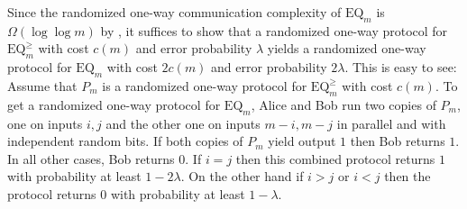 \documentclass{article}\usepackage[a4paper,margin=20mm]{geometry}
\renewcommand{\geq}{\geqslant}
\begin{document}
Since the randomized one-way communication complexity of $\mathrm{EQ}_m$ is $\Omega(\log \log m)$ by , it suffices to 
show that a randomized one-way protocol for $\mathrm{EQ}^{\geq}_m$ with cost $c(m)$ and error probability $\lambda$ yields a 
randomized one-way protocol for $\mathrm{EQ}_m$ with cost $2 c(m)$ and error probability $2\lambda$. This is easy to see: Assume that 
$P_m$ is a randomized one-way protocol for $\mathrm{EQ}^{\geq}_m$ with cost $c(m)$. To get a 
randomized one-way protocol for $\mathrm{EQ}_m$, Alice and Bob run two copies of $P_m$, one on inputs $i,j$ and the other one on inputs
$m-i, m-j$ in parallel and with independent random bits.
If both copies of $P_m$ yield output $1$ then Bob returns $1$. In all other cases, Bob returns $0$.
If $i=j$ then this combined protocol returns $1$ with probability at least $1-2\lambda$.
On the other hand if $i > j$ or $i < j$ then the protocol returns $0$ with probability at least $1-\lambda$.
\end{document}
